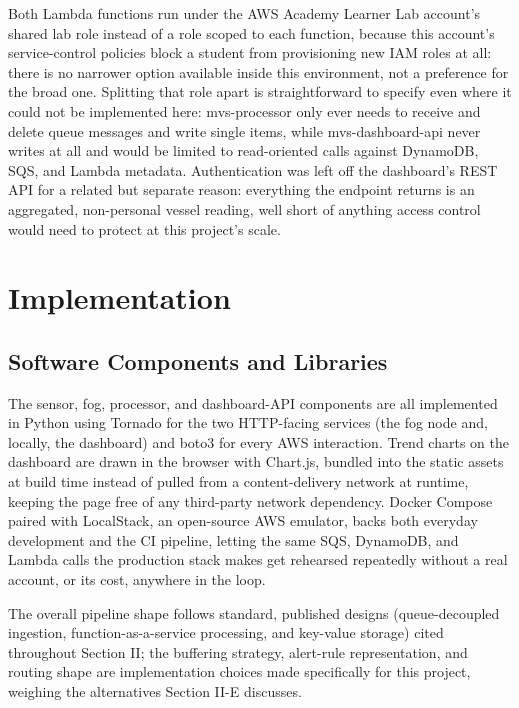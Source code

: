 \documentclass[conference]{IEEEtran}
\begin{document}
Both Lambda functions run under the AWS Academy Learner Lab account's shared lab role instead of a role scoped to each function, because this account's service-control policies block a student from provisioning new IAM roles at all: there is no narrower option available inside this environment, not a preference for the broad one. Splitting that role apart is straightforward to specify even where it could not be implemented here: mvs-processor only ever needs to receive and delete queue messages and write single items, while mvs-dashboard-api never writes at all and would be limited to read-oriented calls against DynamoDB, SQS, and Lambda metadata. Authentication was left off the dashboard's REST API for a related but separate reason: everything the endpoint returns is an aggregated, non-personal vessel reading, well short of anything access control would need to protect at this project's scale.

\section{Implementation}

\subsection{Software Components and Libraries}
The sensor, fog, processor, and dashboard-API components are all implemented in Python using Tornado for the two HTTP-facing services (the fog node and, locally, the dashboard) and boto3 for every AWS interaction. Trend charts on the dashboard are drawn in the browser with Chart.js, bundled into the static assets at build time instead of pulled from a content-delivery network at runtime, keeping the page free of any third-party network dependency. Docker Compose paired with LocalStack, an open-source AWS emulator, backs both everyday development and the CI pipeline, letting the same SQS, DynamoDB, and Lambda calls the production stack makes get rehearsed repeatedly without a real account, or its cost, anywhere in the loop.

The overall pipeline shape follows standard, published designs (queue-decoupled ingestion, function-as-a-service processing, and key-value storage) cited throughout Section II; the buffering strategy, alert-rule representation, and routing shape are implementation choices made specifically for this project, weighing the alternatives Section II-E discusses.
\end{document}

